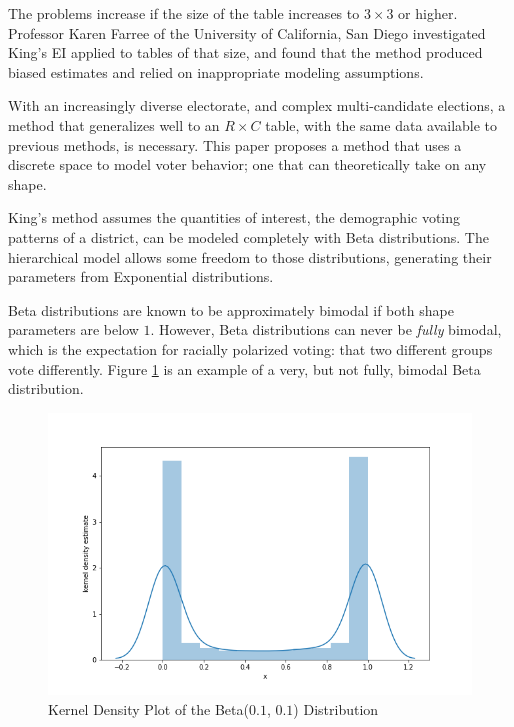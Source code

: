 The problems increase if the size of the table increases to $3 \times 3$ or higher. Professor Karen Farree of the University of California, San Diego investigated King's EI applied to tables of that size, and found that the method produced biased estimates and relied on inappropriate modeling assumptions.\cite{ferree}

With an increasingly diverse electorate, and complex multi-candidate elections, a method that generalizes well to an $R \times C$ table, with the same data available to previous methods, is necessary. This paper proposes a method that uses a discrete space to model voter behavior; one that can theoretically take on any shape.



King's method assumes the quantities of interest, the demographic voting patterns of a district, can be modeled completely with Beta distributions. The hierarchical model allows some freedom to those distributions, generating their parameters from Exponential distributions.

Beta distributions are known to be approximately bimodal if both shape parameters are below $1$. However, Beta distributions can never be \textit{fully} bimodal, which is the expectation for racially polarized voting: that two different groups vote differently. Figure \ref{fig:beta_example} is an example of a very, but not fully, bimodal Beta distribution.

\begin{figure}[ht]\centering
 \includegraphics[width=\linewidth]{figures/beta_example.png}
 \caption{Kernel Density Plot of the Beta($0.1$, $0.1$) Distribution}
 \label{fig:beta_example}
\end{figure}

